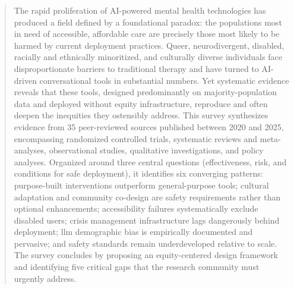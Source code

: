 \begin{abstract}
The rapid proliferation of AI-powered mental health technologies has produced a field defined by a foundational paradox: the populations most in need of accessible, affordable care are precisely those most likely to be harmed by current deployment practices. Queer, neurodivergent, disabled, racially and ethnically minoritized, and culturally diverse individuals face disproportionate barriers to traditional therapy and have turned to AI-driven conversational tools in substantial numbers. Yet systematic evidence reveals that these tools, designed predominantly on majority-population data and deployed without equity infrastructure, reproduce and often deepen the inequities they ostensibly address. This survey synthesizes evidence from 35 peer-reviewed sources published between 2020 and 2025, encompassing randomized controlled trials, systematic reviews and meta-analyses, observational studies, qualitative investigations, and policy analyses. Organized around three central questions (effectiveness, risk, and conditions for safe deployment), it identifies six converging patterns: purpose-built interventions outperform general-purpose tools; cultural adaptation and community co-design are safety requirements rather than optional enhancements; accessibility failures systematically exclude disabled users; crisis management infrastructure lags dangerously behind deployment; \gls{llm} demographic bias is empirically documented and pervasive; and safety standards remain underdeveloped relative to scale. The survey concludes by proposing an equity-centered design framework and identifying five critical gaps that the research community must urgently address.
\end{abstract}